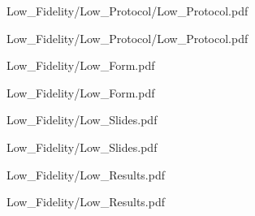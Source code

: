 \documentclass[a4 paper, 12pt]{article}
\begin{document}
    
                    {Low_Fidelity/Low_Protocol/Low_Protocol.pdf}
                    \label{sec:A.1}
    
                    {Low_Fidelity/Low_Protocol/Low_Protocol.pdf}

    \pagebreak
    
                    {Low_Fidelity/Low_Form.pdf}
                    \label{sec:A.2}
    
                    {Low_Fidelity/Low_Form.pdf}

    \pagebreak
    
                    {Low_Fidelity/Low_Slides.pdf}
                    \label{sec:A.3}
    
                    {Low_Fidelity/Low_Slides.pdf}

        \pagebreak
        
                    {Low_Fidelity/Low_Results.pdf}
                    \label{sec:A.4}
    
                    {Low_Fidelity/Low_Results.pdf}
\end{document}
